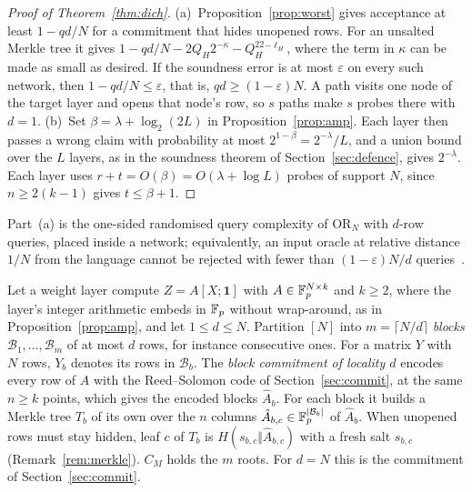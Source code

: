 \begin{proof}[Proof of Theorem~\ref{thm:dich}]
(a)~Proposition~\ref{prop:worst} gives acceptance at least $1-qd/N$ for a commitment that hides
unopened rows. For an unsalted Merkle tree it gives $1-qd/N-2Q_H2^{-\kappa}-Q_H^22^{-\ell_H}$, where the
term in $\kappa$ can be made as small as desired. If the soundness
error is at most $\varepsilon$ on every such network, then $1-qd/N\le\varepsilon$, that is,
$qd\ge(1-\varepsilon)N$. A path visits one node of the target layer and opens that node's row, so
$s$ paths make $s$ probes there with $d=1$.
(b)~Set $\beta=\lambda+\log_2(2L)$ in Proposition~\ref{prop:amp}. Each layer then passes a wrong
claim with probability at most $2^{1-\beta}=2^{-\lambda}/L$, and a union bound over the $L$ layers,
as in the soundness theorem of Section~\ref{sec:defence}, gives $2^{-\lambda}$. Each layer uses
$r+t=O(\beta)=O(\lambda+\log L)$ probes of support $N$, since $n\ge2(k-1)$ gives $t\le\beta+1$.
\end{proof}

\noindent Part~(a) is the one-sided randomised query complexity of $\mathrm{OR}_N$ with $d$-row
queries, placed inside a network; equivalently, an input oracle at relative distance $1/N$ from the
language cannot be rejected with fewer than $(1-\varepsilon)N/d$ queries~\cite{bghsv2006robust}.

 Let a weight layer compute $Z=A[X;\mathbf 1]$ with $A\in\mathbb{F}_p^{N\times k}$ and
$k\ge2$, where the layer's integer arithmetic embeds in $\mathbb{F}_p$ without wrap-around, as in
Proposition~\ref{prop:amp}, and let $1\le d\le N$. Partition $[N]$ into $m=\lceil N/d\rceil$
\emph{blocks} $\mathcal B_1,\dots,\mathcal B_m$ of at most $d$ rows, for instance consecutive ones.
For a matrix $Y$ with $N$ rows, $Y_b$ denotes its rows in $\mathcal B_b$. The \emph{block commitment
of locality $d$} encodes every row of $A$ with the Reed--Solomon code of Section~\ref{sec:commit}, at
the same $n\ge k$ points, which gives the encoded blocks $\hat A_b$. For each block it builds a Merkle
tree $T_b$ of its own over the $n$ columns $\hat A_{b,c}\in\mathbb{F}_p^{|\mathcal B_b|}$ of $\hat A_b$. When
unopened rows must stay hidden, leaf $c$ of $T_b$ is $H(s_{b,c}\Vert\hat A_{b,c})$ with a fresh salt
$s_{b,c}$ (Remark~\ref{rem:merkle}). $C_M$ holds the $m$ roots. For $d=N$ this is the commitment of
Section~\ref{sec:commit}.

